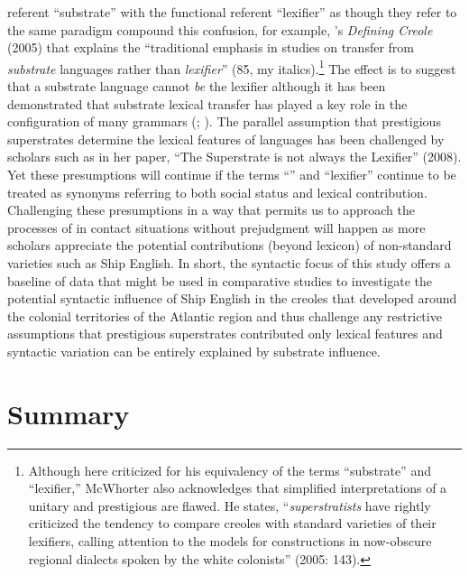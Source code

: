 referent “substrate” with the functional referent “lexifier” as though they refer to the same paradigm compound this confusion, for example, \citeauthor{McWhorter2005}’s \textit{Defining Creole} (2005) that explains the “traditional emphasis in  studies on transfer from \textit{substrate} languages rather than \textit{lexifier}” (85, my italics).\footnote{Although here criticized for his equivalency of the terms “substrate” and “lexifier,” McWhorter also acknowledges that simplified interpretations of a unitary and prestigious  are flawed. He states, “\textit{superstratists} have rightly criticized the tendency to compare creoles with standard varieties of their lexifiers, calling attention to the models for  constructions in now-obscure regional dialects spoken by the white colonists” (2005: 143).}  The effect is to suggest that a substrate language cannot \textit{be} the lexifier although it has been demonstrated that substrate lexical transfer has played a key role in the configuration of many  grammars (\citealt{Kihm1989}; \citealt{Migge1998}). The parallel assumption that prestigious superstrates determine the lexical features of  languages has been challenged by scholars such as \citeauthor{Selbach2008} in her paper, “The Superstrate is not always the Lexifier” (2008). Yet these presumptions will continue if the terms “” and “lexifier” continue to be treated as synonyms referring to both social status and lexical contribution. Challenging these presumptions in a way that permits us to approach the processes of  in contact situations without prejudgment will happen as more scholars appreciate the potential contributions (beyond lexicon) of non-standard varieties such as Ship English. In short, the syntactic focus of this study offers a baseline of data that might be used in comparative studies to investigate the potential syntactic influence of Ship English in the creoles that developed around the colonial territories of the Atlantic region and thus challenge any restrictive assumptions that prestigious superstrates contributed only lexical features and syntactic variation can be entirely explained by substrate influence. 

\section{{Summary}}%

